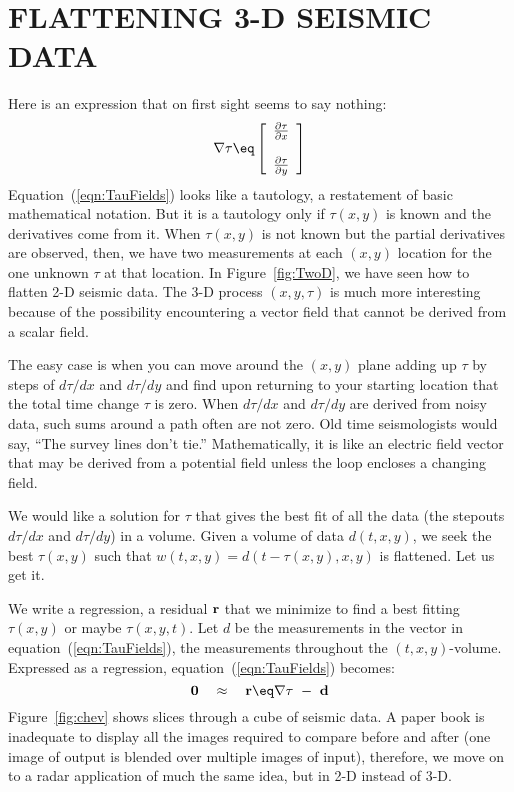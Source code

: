 \section{FLATTENING 3-D SEISMIC DATA}

Here is an expression that on first sight seems to say nothing:
\begin{equation}
\nabla \tau \eq 
\left[
\begin{array}{c}
\frac{\partial \tau}{\partial x} \\
\\
\frac{\partial \tau}{\partial y}
\end{array}
\right] \label{eqn:TauFields}
\end{equation}
Equation~(\ref{eqn:TauFields}) looks like a tautology,
a restatement of basic mathematical notation. 
But it is a tautology
only if $\tau (x , y )$ is known and the derivatives come from it.
When $\tau (x , y )$ is not known but the partial derivatives are observed,
then, we have two measurements at each $(x , y )$ location
for the one unknown $\tau$ at that location. 
In Figure~\ref{fig:TwoD}, we have seen how to flatten 2-D seismic data.
The 3-D process $(x,y,\tau)$ is much more interesting because
of the possibility encountering a vector field that
cannot be derived from a scalar field.
\par
The easy case is when you can move around the $(x,y)$ plane
adding up $\tau$ by steps of $d\tau/dx$ and $d\tau/dy$ and find
upon returning to your starting location that the total time change $\tau$ is zero.
When  $d\tau/dx$ and $d\tau/dy$ are derived from noisy data,
such sums around a path often are not zero.
Old time seismologists would say, ``The survey lines don't tie.''
Mathematically,
it is like an electric field vector that may be derived
from a potential field
unless the loop encloses a changing  field.
\par
We would like a solution for $\tau$
that gives the best fit of all the data
(the stepouts  $d\tau/dx$ and $d\tau/dy$)
in a volume.
Given a volume of data $d(t , x , y )$, we seek
the best $\tau (x , y )$ such that
$w(t , x , y )= d (t-\tau (x , y ), x , y )$
is  flattened. Let us get it.
\par
We write a regression, a residual ${\bf r}$ that
we minimize to find a best fitting
$\tau (x , y )$ or maybe $\tau (x , y , t )$.
Let $d$ be the measurements in the vector in equation~(\ref{eqn:TauFields}),
the measurements throughout the $(t , x , y )$-volume.
Expressed as a regression, equation~(\ref{eqn:TauFields}) becomes:
\begin{equation}
{\bf 0} \quad \approx\quad  {\bf r} \eq \nabla \tau \ -\  {\bf d}
\end{equation}
Figure~\ref{fig:chev} shows slices through a cube of seismic data.
A paper book is inadequate to display all the images required
to compare before and after
(one image of output is blended over multiple images of input),
therefore, we move on to a radar application of much the same idea,
but in 2-D instead of 3-D.

